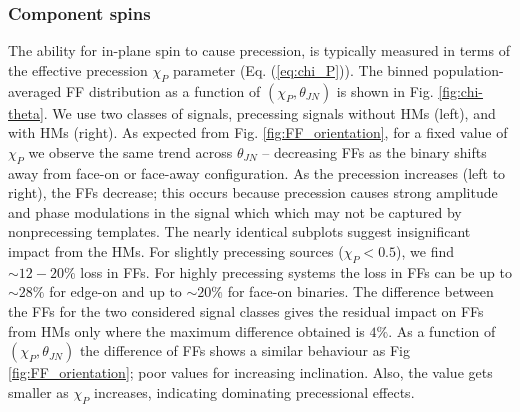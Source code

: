 \subsubsection{Component spins} \label{component-spins}
 The ability for in-plane spin to cause precession, is typically measured in terms of the effective precession $\chi_P$ parameter (Eq. (\ref{eq:chi_P})). The binned population-averaged FF distribution as a function of $(\chi_P, \theta_{JN})$ is shown in Fig. \ref{fig:chi-theta}. We use two classes of signals, precessing signals without HMs (left), and with HMs (right). As expected from Fig. \ref{fig:FF_orientation}, for a fixed value of $\chi_P$ we observe the same trend across $\theta_{JN}$ -- decreasing FFs as the binary shifts away from face-on or face-away configuration. As the precession increases (left to right), the FFs decrease; this occurs because precession causes strong amplitude and phase modulations in the signal which which may not be captured by nonprecessing templates. The nearly identical subplots suggest insignificant impact from the HMs. For slightly precessing sources ($\chi_P < 0.5$), we find $\sim 12-20\%$ loss in FFs. For highly precessing systems the loss in FFs can be up to $\sim 28\%$ for edge-on and up to $\sim 20\%$ for face-on binaries. The difference between the FFs for the two considered signal classes gives the residual impact on FFs from HMs only where the maximum difference obtained is $4\%$. As a function of $(\chi_P, \theta_{JN})$ the difference of FFs shows a similar behaviour as Fig \ref{fig:FF_orientation}; poor values for increasing inclination. Also, the value gets smaller as $\chi_P$ increases, indicating dominating precessional effects.

